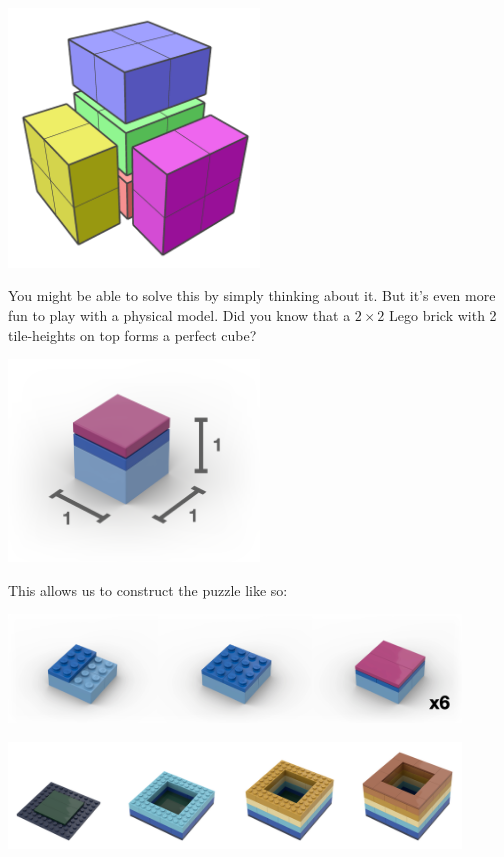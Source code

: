 \documentclass[
]{article}
\begin{document}
\begin{center}\includegraphics[width=0.5\textwidth]{img/img2.pdf}\end{center}

You might be able to solve this by simply thinking about it. But it's
even more fun to play with a physical model. \newline Did you know that
a \(2\times 2\) Lego brick with 2 tile-heights on top forms a perfect
cube?

\begin{center}\includegraphics[width=0.5\textwidth]{img/annotated_lego_cube.png}\end{center}

This allows us to construct the puzzle like so:

\begin{center}\includegraphics[width=0.9\textwidth,height=\textheight]{img/piece_steps2.png}\end{center}
\begin{center}\includegraphics[width=0.9\textwidth,height=\textheight]{img/puzzle_box_steps.png}\end{center}
\end{document}
